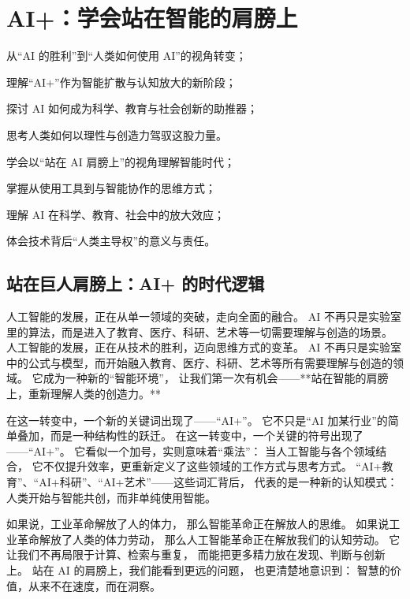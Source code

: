 \chapter{AI+：学会站在智能的肩膀上}

\begin{introduction}
  \item 从“AI 的胜利”到“人类如何使用 AI”的视角转变；
  \item 理解“AI+”作为智能扩散与认知放大的新阶段；
  \item 探讨 AI 如何成为科学、教育与社会创新的助推器；
  \item 思考人类如何以理性与创造力驾驭这股力量。
\end{introduction}

\begin{introduction}
  \item 学会以“站在 AI 肩膀上”的视角理解智能时代；
  \item 掌握从使用工具到与智能协作的思维方式；
  \item 理解 AI 在科学、教育、社会中的放大效应；
  \item 体会技术背后“人类主导权”的意义与责任。
\end{introduction}

\section{站在巨人肩膀上：AI+ 的时代逻辑}

人工智能的发展，正在从单一领域的突破，走向全面的融合。  
AI 不再只是实验室里的算法，而是进入了教育、医疗、科研、艺术等一切需要理解与创造的场景。  
人工智能的发展，正在从技术的胜利，迈向思维方式的变革。  
AI 不再只是实验室中的公式与模型，而开始融入教育、医疗、科研、艺术等所有需要理解与创造的领域。  
它成为一种新的“智能环境”，  
让我们第一次有机会——**站在智能的肩膀上，重新理解人类的创造力。**

在这一转变中，一个新的关键词出现了——“AI+”。  
它不只是“AI 加某行业”的简单叠加，而是一种结构性的跃迁。  
在这一转变中，一个关键的符号出现了——“AI+”。  
它看似一个加号，实则意味着“乘法”：  
当人工智能与各个领域结合，  
它不仅提升效率，更重新定义了这些领域的工作方式与思考方式。  
“AI+教育”、“AI+科研”、“AI+艺术”——这些词汇背后，  
代表的是一种新的认知模式：  
人类开始与智能共创，而非单纯使用智能。

如果说，工业革命解放了人的体力，  
那么智能革命正在解放人的思维。  
如果说工业革命解放了人类的体力劳动，  
那么人工智能革命正在解放我们的认知劳动。  
它让我们不再局限于计算、检索与重复，  
而能把更多精力放在发现、判断与创新上。  
站在 AI 的肩膀上，我们能看到更远的问题，  
也更清楚地意识到：  
智慧的价值，从来不在速度，而在洞察。

